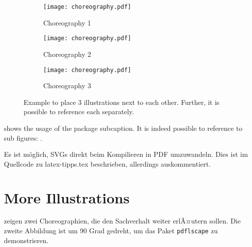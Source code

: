 \begin{figure}
  \hfill
  \begin{subfigure}{.3\textwidth}
    \texttt{[image: choreography.pdf]}
    \caption{Choreography 1}
    \label{fig:subfigA}
  \end{subfigure}
  \hfill
  \begin{subfigure}{.3\textwidth}
    \texttt{[image: choreography.pdf]}
    \caption{Choreography 2}
    \label{fig:subfigB}
  \end{subfigure}
  \hfill
  \begin{subfigure}{.3\textwidth}
    \texttt{[image: choreography.pdf]}
    \caption{Choreography 3}
    \label{fig:subfigC}
  \end{subfigure}
  \caption{Example to place 3 illustrations next to each other. Further, it is possible to reference each separately.}
  \label{fig:subfig_example}
\end{figure}

 shows the usage of the package subcaption.
It is indeed possible to reference to sub figures: .

Es ist möglich, SVGs direkt beim Kompilieren in PDF umzuwandeln.
Dies ist im Quellcode zu latex-tipps.tex beschrieben, allerdings auskommentiert.

\iffalse %
  Das SVG in \cref{fig:directSVG} ist direkt eingebunden, während der Text im SVG in \cref{fig:latexSVG} mittels pdflatex gesetzt ist.
  Falls man die Graphiken sehen möchte, muss inkscape im PATH sein und im Tex-Quelltext \texttt{\textbackslash{}iffalse} und \texttt{\textbackslash{}iftrue} auskommentiert sein.

  \begin{figure}
    \centering
    \texttt{[image: svgexample.svg]}
    \caption{SVG direkt eingebunden}
    \label{fig:directSVG}
  \end{figure}

  \begin{figure}
    \centering
    \def\svgwidth{.4\textwidth}
    
    \caption{Text im SVG mittels \LaTeX{} gesetzt}
    \label{fig:latexSVG}
  \end{figure}
\fi %



\section{More Illustrations}
 zeigen zwei Choreographien, die den Sachverhalt weiter erlÃ¤utern sollen.
Die zweite Abbildung ist um 90 Grad gedreht, um das Paket \texttt{pdflscape} zu demonstrieren.

